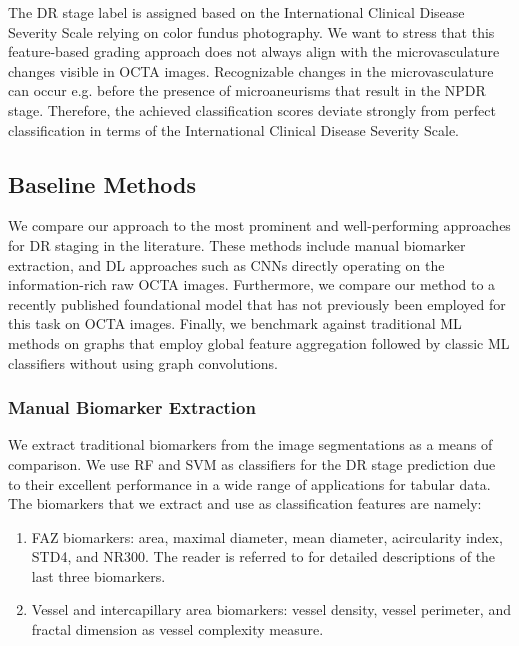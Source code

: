
The DR stage label is assigned based on the International Clinical Disease Severity Scale \cite{wilkinson2003proposed} relying on color fundus photography. We want to stress that this feature-based grading approach does not always align with the microvasculature changes visible in OCTA images. Recognizable changes in the microvasculature can occur e.g. before the presence of microaneurisms that result in the NPDR stage. Therefore, the achieved classification scores deviate strongly from perfect classification in terms of the International Clinical Disease Severity Scale. 

\subsection{Baseline Methods}
We compare our approach to the most prominent and well-performing approaches for DR staging in the literature. These methods include manual biomarker extraction, and DL approaches such as CNNs directly operating on the information-rich raw OCTA images. Furthermore, we compare our method to a recently published foundational model that has not previously been employed for this task on OCTA images. Finally, we benchmark against traditional ML methods on graphs that employ global feature aggregation followed by classic ML classifiers without using graph convolutions.



\subsubsection{Manual Biomarker Extraction}
We extract traditional biomarkers from the image segmentations as a means of comparison. We use RF and SVM as classifiers for the DR stage prediction due to their excellent performance in a wide range of applications for tabular data. The biomarkers that we extract and use as classification features are namely: 
\begin{enumerate}
    \item FAZ biomarkers: area, maximal diameter, mean diameter, acircularity index, STD4, and NR300. The reader is referred to \cite{lu2018evaluation} for detailed descriptions of the last three biomarkers. 
    \item Vessel and intercapillary area biomarkers: vessel density, vessel perimeter, and fractal dimension as vessel complexity measure. 
\end{enumerate}


